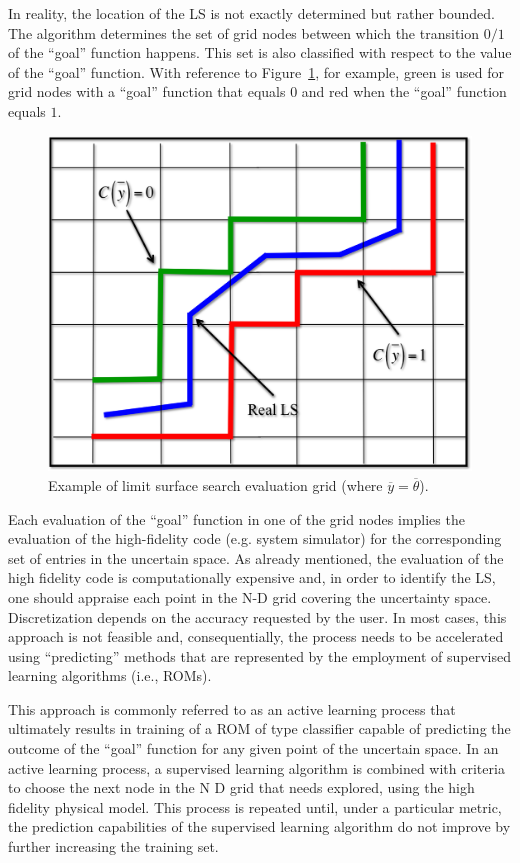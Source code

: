 In reality, the location of the LS is not exactly determined but rather 
bounded. The algorithm determines the set of grid nodes between 
which the transition $0/1$ of the ``goal'' function happens. This set is 
also classified with respect to the value of the ``goal'' function. With 
reference to Figure~\ref{fig:LSgoalFunctionExample}, for example, 
green is used for grid nodes with a 
``goal'' function that equals $0$ and red when the ``goal'' function 
equals $1$.
\begin{figure}[h!]
  \centering
  \includegraphics[width=1.0\textwidth]  {pics/LSgoalFunctionExample.png}
  \caption{Example of limit surface search evaluation grid (where $\overline{y}=\overline{\theta}$).}
  \label{fig:LSgoalFunctionExample}
\end{figure}
Each evaluation of the ``goal'' function in one of the grid nodes implies 
the evaluation of the high-fidelity code (e.g. system simulator) for the 
corresponding set of entries in the uncertain space. As already 
mentioned, the evaluation of the high fidelity code is computationally 
expensive and, in order to identify the LS, one should appraise 
each point in the N-D grid covering the uncertainty space. 
Discretization depends on the accuracy requested by the user. In 
most cases, this approach is not feasible and, consequentially, the 
process needs to be accelerated using ``predicting'' methods that are 
represented by the employment of supervised learning algorithms 
(i.e., ROMs).

This approach is commonly referred to as an active learning process 
that ultimately results in training of a ROM of type classifier capable of 
predicting the outcome of the ``goal'' function for any given point of 
the uncertain space.
In an active learning process, a supervised learning algorithm is 
combined with criteria to choose the next node in the N D grid that 
needs explored, using the high fidelity physical model. This process is 
repeated until, under a particular metric, the prediction capabilities of 
the supervised learning algorithm do not improve by further increasing 
the training set.


